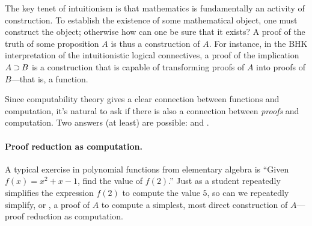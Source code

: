 The key tenet of intuitionism
is that mathematics is fundamentally an activity of construction.
To establish the existence of some mathematical object, one must construct the object; otherwise how can one be sure that it exists?
A proof of the truth of some proposition $A$ is thus a construction of $A$.
For instance, in the \acf{BHK} interpretation of the intuitionistic logical connectives, a proof of the implication $A \mathbin{\supset} B$ is a construction that is capable of transforming proofs of $A$ into proofs of $B$---that is, a function.

Since computability theory gives a clear connection between functions and computation,
it's natural to ask if there is also a connection between \emph{proofs} and computation.
Two answers (at least) are possible:  and .


\paragraph*{Proof reduction as computation.}
A typical exercise in polynomial functions from elementary algebra is ``Given $f(x) = x^2 + x - 1$, find the value of $f(2)$.''
Just as a student repeatedly simplifies the expression $f(2)$ to compute the value $5$, so can we repeatedly simplify, or , a proof of $A$ to compute a simplest, most direct construction of $A$---proof reduction as computation.  

